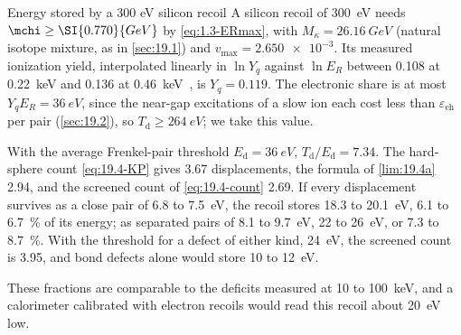 \begin{workedexample}{Energy stored by a 300 eV silicon recoil}\label{we:19-fp300}
A silicon recoil of \SI{300}{eV} needs $\mchi \ge \SI{0.770}{GeV}$ by \cref{eq:1.3-ERmax}, with $M_\kappa = \SI{26.16}{GeV}$ (natural isotope mixture, as in \cref{sec:19.1}) and $v_{\mathrm{max}} = \num{2.650e-3}$. Its measured ionization yield, interpolated linearly in $\ln Y_q$ against $\ln E_R$ between 0.108 at \SI{0.22}{keV} and 0.136 at \SI{0.46}{keV}~\cite[Table~II]{albakry2023first}, is $Y_q = 0.119$. The electronic share is at most $Y_qE_R = \SI{36}{eV}$, since the near-gap excitations of a slow ion each cost less than $\varepsilon_{\mathrm{eh}}$ per pair (\cref{sec:19.2}), so $T_{\mathrm{d}} \ge \SI{264}{eV}$; we take this value.

With the average Frenkel-pair threshold $E_{\mathrm{d}} = \SI{36}{eV}$, $T_{\mathrm{d}}/E_{\mathrm{d}} = 7.34$. The hard-sphere count \cref{eq:19.4-KP} gives 3.67 displacements, the formula of \cref{lim:19.4a} 2.94, and the screened count of \cref{eq:19.4-count} 2.69. If every displacement survives as a close pair of 6.8 to \SI{7.5}{eV}, the recoil stores 18.3 to \SI{20.1}{eV}, 6.1 to \SI{6.7}{\percent} of its energy; as separated pairs of 8.1 to \SI{9.7}{eV}, 22 to \SI{26}{eV}, or 7.3 to \SI{8.7}{\percent}. With the threshold for a defect of either kind, \SI{24}{eV}, the screened count is 3.95, and bond defects alone would store 10 to \SI{12}{eV}.

These fractions are comparable to the deficits measured at 10 to \SI{100}{keV}, and a calorimeter calibrated with electron recoils would read this recoil about \SI{20}{eV} low.
\end{workedexample}
